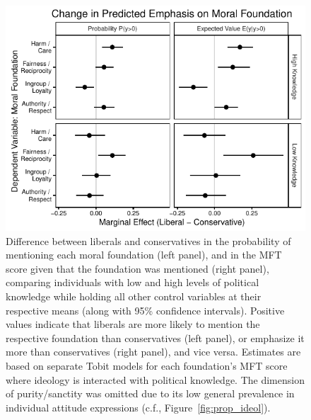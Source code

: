 \documentclass[12pt]{article}
\begin{document}
\begin{figure}[ht]\centering
\includegraphics{../calc/fig/tobit_ideol_know.pdf}
\caption{Difference between liberals and conservatives in the probability of mentioning each moral foundation (left panel), and in the MFT score given that the foundation was mentioned (right panel), comparing individuals with low and high levels of political knowledge while holding all other control variables at their respective means (along with 95\% confidence intervals). Positive values indicate that liberals are more likely to mention the respective foundation than conservatives (left panel), or emphasize it more than conservatives (right panel), and vice versa. Estimates are based on separate Tobit models for each foundation's MFT score where ideology is interacted with political knowledge. The dimension of purity/sanctity was omitted due to its low general prevalence in individual attitude expressions (c.f., Figure~\ref{fig:prop_ideol}).}\label{fig:tobit_ideol_know}
\end{figure}
\end{document}

